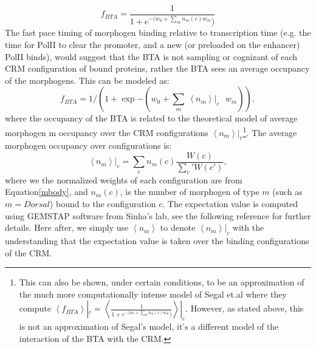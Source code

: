 \begin{equation}\label{segcon}
     f_{BTA}= \frac{1}{1 + e^{ -(w_{0} + \sum_{m}  n_m(c)   w_{m}})}
\end{equation}
The fast pace timing of morphogen binding relative to transcription time (e.g. the time for PolII to clear the promoter, and a new (or preloaded on the enhancer) PolII binds), would suggest that the BTA is not sampling or cognizant of each CRM configuration of bound proteins, rather the BTA sees an average occupancy of the morphogens.  This can be modeled as:
\begin{equation}\label{segcon2}
    f_{BTA}  = 1/(1 + \exp{ -(w_{0} + \sum_{m}  \  \left< n_m \right>|_{c} \ \ \ w_{m}) }),
\end{equation}
where the occupancy of the BTA is related to the theoretical model of average morphogen m occupancy over the CRM configurations $\left< n_m \right>|_{c}$\footnote{This can also be shown, under certain conditions, to be an approximation of the much more computationally intense model of Segal et.al\cite{pmid18172436} where they compute $ \left< f_{BTA} \right>|_c = \left<  \frac{1}{1 + e^{ -(w_{0} + \sum_{m}  n_m(c)   w_{m}})} \right>|_c$.  However, as stated above, this is not an approximation of Segal's model, it's a different model of the interaction of the BTA with the CRM.}.  The average morphogen occupancy over configurations is:
\begin{equation}
   \left< n_m \right>|_{c} = \sum_c n_m(c) \frac{W(c)}{\sum_c' W(c')},
   \end{equation}   
   where we the normalized weights of each configuration are from Equation\ref{mbody}, and $n_m(c) $, is the number of morphogen of type $m$ (such as $m=Dorsal$) bound to the configuration $c$.  The expectation value is computed using GEMSTAP software from Sinha's lab, see the following reference for further details\cite{pmid19956545}.  Here after, we simply use $ \left<n_m \right>$ to denote $\left< n_m \right>|_{c} $ with the understanding that the expectation value is taken over the binding configurations of the CRM. 

%

